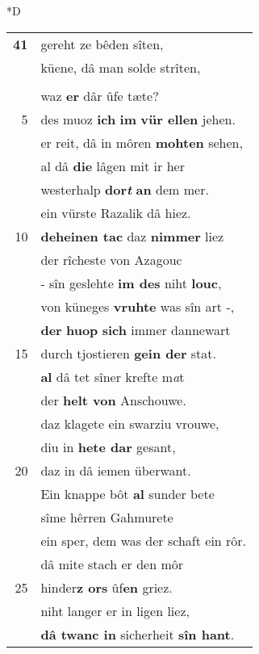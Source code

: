 \documentclass[8pt,a4paper,notitlepage]{article}
\begin{document}
\begin{table}[ht]
\begin{minipage}[t]{0.5\linewidth}
\small
\begin{center}*D
\end{center}
\begin{tabular}{rl}
\textbf{41} & gereht ze bêden sîten,\\ 
 & küene, dâ man solde strîten,\\ 
 & \textit{\begin{large}V\end{large}}erhalden unt dræte.\\ 
 & waz \textbf{er} dâr ûfe tæte?\\ 
5 & des muoz \textbf{ich} \textbf{im} \textbf{vür ellen} jehen.\\ 
 & er reit, dâ in môren \textbf{mohten} sehen,\\ 
 & al dâ \textbf{die} lâgen mit ir her\\ 
 & westerhalp \textbf{dor\textit{t}} \textbf{an} dem mer.\\ 
 & ein vürste Razalik dâ hiez.\\ 
10 & \textbf{deheinen tac} daz \textbf{nimmer} liez\\ 
 & der rîcheste von Azagouc\\ 
 & - sîn geslehte \textbf{im des} niht \textbf{louc},\\ 
 & von küneges \textbf{vruhte} was sîn art -,\\ 
 & \textbf{der} \textbf{huop} \textbf{sich} immer dannewart\\ 
15 & durch tjostieren \textbf{gein der} stat.\\ 
 & \textbf{al} dâ tet sîner krefte m\textit{a}t\\ 
 & der \textbf{helt von} Anschouwe.\\ 
 & daz klagete ein swarziu vrouwe,\\ 
 & diu in \textbf{hete dar} gesant,\\ 
20 & daz in dâ iemen überwant.\\ 
 & Ein knappe bôt \textbf{al} sunder bete\\ 
 & sîme hêrren Gahmurete\\ 
 & ein sper, dem was der schaft ein rôr.\\ 
 & dâ mite stach er den môr\\ 
25 & hinder\textbf{z ors} ûf\textbf{en} griez.\\ 
 & niht langer er in ligen liez,\\ 
 & \textbf{dâ twanc in} sicherheit \textbf{sîn hant}.\\ 

\end{tabular}
\end{minipage}
\end{table}
\end{document}
